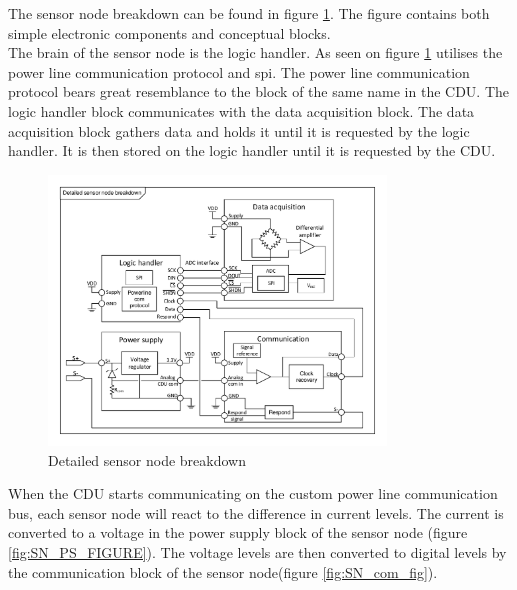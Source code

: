 The sensor node breakdown can be found in figure \ref{fig:SN_detailed}. The figure contains both simple electronic components and conceptual blocks.\\
The brain of the sensor node is the logic handler. As seen on figure \ref{fig:SN_detailed} utilises the power line communication protocol and spi. The power line communication protocol bears great resemblance to the block of the same name in the CDU. The logic handler block communicates with the data acquisition block. The data acquisition block gathers data and holds it until it is requested by the logic handler. It is then stored on the logic handler until it is requested by the CDU.
\begin{figure}[htbp]
	\centering
	\includegraphics[width=0.8\textwidth]{billeder/11ProjectDescription/SN_detailed_design}
	\caption{Detailed sensor node breakdown}
	\label{fig:SN_detailed}
\end{figure}
When the CDU starts communicating on the custom power line communication bus, each sensor node will react to the difference in current levels. The current is converted to a voltage in the power supply block of the sensor node (figure \ref{fig:SN_PS_FIGURE}). The voltage levels are then converted to digital levels by the communication block of the sensor node(figure \ref{fig:SN_com_fig}).
